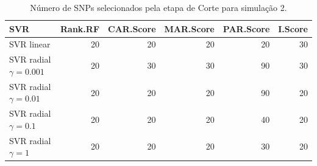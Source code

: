 \begin{table}[ht]
\centering
\begin{tabular}{lrrrrr}
  \hline
SVR & Rank.RF & CAR.Score & MAR.Score & PAR.Score & I.Score \\ 
  \hline
SVR linear & 20 & 20 & 20 & 20 & 30 \\ 
  SVR radial $\gamma = 0.001$ & 20 & 30 & 30 & 90 & 30 \\ 
  SVR radial $\gamma = 0.01$ & 20 & 20 & 20 & 90 & 20 \\ 
  SVR radial $\gamma = 0.1$ & 20 & 20 & 20 & 40 & 20 \\ 
  SVR radial $\gamma = 1$ & 20 & 20 & 20 & 30 & 20 \\ 
   \hline
\end{tabular}
\caption{Número de SNPs selecionados pela etapa de Corte para simulação 2.} 
\end{table}
